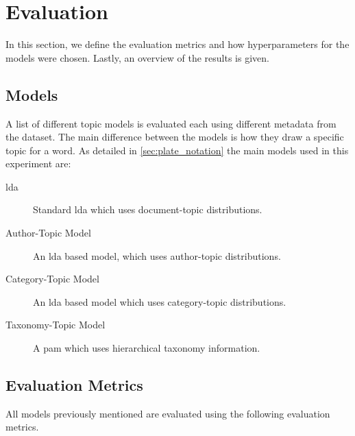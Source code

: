 \section{Evaluation}\label{sec:experiment}
In this section, we define the evaluation metrics and how hyperparameters for the models were chosen.
Lastly, an overview of the results is given.

\subsection{Models}\label{sec:experiment_models}
A list of different topic models is evaluated each using different metadata from the dataset.
The main difference between the models is how they draw a specific topic for a word.
As detailed in \autoref{sec:plate_notation} the main models used in this experiment are:
\begin{description}
	\item[\Acrlong{lda}] Standard \gls{lda} which uses document-topic distributions.
	\item[Author-Topic Model]\cite{author_topic_2012} An \gls{lda} based model, which uses author-topic distributions.
	\item[Category-Topic Model] An \gls{lda} based model which uses category-topic distributions.
	\item[Taxonomy-Topic Model] A \acrlong{pam} which uses hierarchical taxonomy information.
\end{description}

\subsection{Evaluation Metrics}\label{sec:experiment_metrics}
All models previously mentioned are evaluated using the following evaluation metrics.

